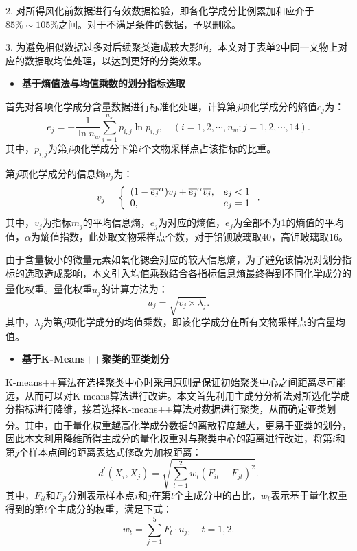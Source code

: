 \documentclass[withoutpreface,bwprint]{cumcmthesis} %
\begin{document}
2. 对所得风化前数据进行有效数据检验，即各化学成分比例累加和应介于  $85\% \sim 105\%$之间。对于不满足条件的数据，予以删除。

3. 为避免相似数据过多对后续聚类造成较大影响，本文对于表单2中同一文物上对应的数据取均值处理，以达到更好的分类效果。

\begin{itemize}
  \item \textbf{基于熵值法与均值乘数的划分指标选取}
\end{itemize}

首先对各项化学成分含量数据进行标准化处理，计算第$j$项化学成分的熵值$e _ { j }$为：
\begin{equation}
  e _ { j } = - \frac { 1 } { \ln n_w } \sum _ { i = 1 } ^ { n_w } p _ { i,j } \ln p _ { i,j },\quad (i=1,2,\cdots,n_w;j=1,2,\cdots,14).
\end{equation}
其中，$p_{i,j}$为第$j$项化学成分下第$i$个文物采样点占该指标的比重。

第$j$项化学成分的信息熵$v _ { j }$为：
\begin{equation}
  v _ { j } = \left\{ \begin{array} { l r } { ( 1 - \overline { e_j } ^ { \alpha } ) v _ {  j } + \overline { e_j } ^ { \alpha }\overline{ v _ {  j } },}&{ e _ { j } < 1 } \\ { 0 , } & { e _ { j } = 1 } \end{array} \right. .
\end{equation}
其中，$\overline{v_{j}}$为指标$m_j$的平均信息熵，$e_j$为对应的熵值，$\overline { e_j}$为全部不为1的熵值的平均值，$\alpha$为熵值指数，此处取文物采样点个数，对于铅钡玻璃取40，高钾玻璃取16。

由于含量极小的微量元素如氧化锶会对应的较大信息熵，为了避免该情况对划分指标的选取造成影响，本文引入均值乘数结合各指标信息熵最终得到不同化学成分的量化权重\textsuperscript{\cite{ref8}}。量化权重$u_j$的计算方法为：
\begin{equation}
 u_j = \sqrt{v_j \times \lambda_j}.
\end{equation}
其中，$\lambda_j$为第$j$项化学成分的均值乘数，即该化学成分在所有文物采样点的含量均值。

\begin{itemize}
  \item \textbf{基于K-Means++聚类的亚类划分}
\end{itemize}

K-means++算法在选择聚类中心时采用原则是保证初始聚类中心之间距离尽可能远，从而可以对K-means算法进行改进。本文首先利用主成分分析法对所选化学成分指标进行降维，接着选择K-means++算法对数据进行聚类，从而确定亚类划分\textsuperscript{\cite{ref7}}。其中，由于量化权重越高化学成分数据的离散程度越大，更易于亚类的划分，因此本文利用降维所得主成分的量化权重对与聚类中心的距离进行改进，将第$i$和第$j$个样本点间的距离表达式修改为加权距离：
\begin{equation}
 d^{\prime}(X_i,X_j) = \sqrt{{\sum_{t=1}^2} w_t {(F_{it}-F_{jt})}^2}.
\end{equation}
其中，$F_{it}$和$F_{jt}$分别表示样本点$i$和$j$在第$t$个主成分中的占比，$w_t$表示基于量化权重得到的第$t$个主成分的权重，满足下式：
\begin{equation}
 w_t = \sum_{j=1}^{5} F_t \cdot u_j,\quad t=1,2.
\end{equation}
\end{document}

